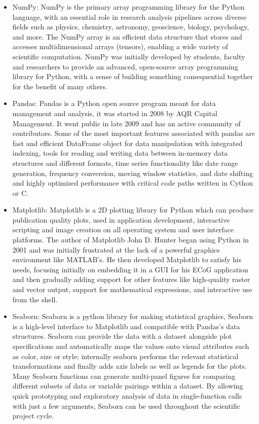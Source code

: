 \begin{itemize}
	\item NumPy: NumPy is the primary array programming library for the Python language, with an essential role in research analysis pipelines across diverse fields such as physics, chemistry, astronomy, geoscience, biology, psychology, and more. The NumPy array is an efficient data structure that stores and accesses multidimensional arrays (tensors), enabling a wide variety of scientific computation. NumPy was initially developed by students, faculty and researchers to provide an advanced, open-source array programming library for Python, with a sense of building something consequential together for the benefit of many others. \cite{python}



	\item Pandas: Pandas is a Python open source program meant for data management and analysis, it was started in 2008 by AQR Capital Management. It went public in late 2009 and has an active community of contributors. Some of the most important features associated with pandas are fast and efficient DataFrame object for data manipulation with integrated indexing, tools for reading and writing data between in-memory data structures and different formats, time series functionality like date range generation, frequency conversion, moving window statistics, and date shifting and highly optimized performance with critical code paths written in Cython or C. \cite{pandas}
	

	
	\item Matplotlib: Matplotlib is a 2D plotting library for Python which can produce publication quality plots, used in application development, interactive scripting and image creation on all operating system and user interface platforms. The author of Matplotlib John D. Hunter began using Python in 2001 and was initially frustrated at the lack of a powerful graphics environment like MATLAB's. He then developed Matplotlib to satisfy his needs, focusing initially on embedding it in a GUI for his ECoG application and then gradually adding support for other features like high-quality raster and vector output, support for mathematical expressions, and interactive use from the shell.\cite{plot}


	\item Seaborn: Seaborn is a python library for making statistical graphics, Seaborn is a high-level interface to Matplotlib and compatible with Pandas's data structures. Seaborn can provide the data with a dataset alongside plot specifications and automatically maps the values onto visual attributes such as color, size or style; internally seaborn performs the relevant statistical transformations and finally adds axis labels as well as legends for the plots. Many Seaborn functions can generate multi-panel figures for comparing different subsets of data or variable pairings within a dataset. By allowing quick prototyping and exploratory analysis of data in single-function calls with just a few arguments, Seaborn can be used throughout the scientific project cycle.  \cite{seaborn}
		


\end{itemize}
